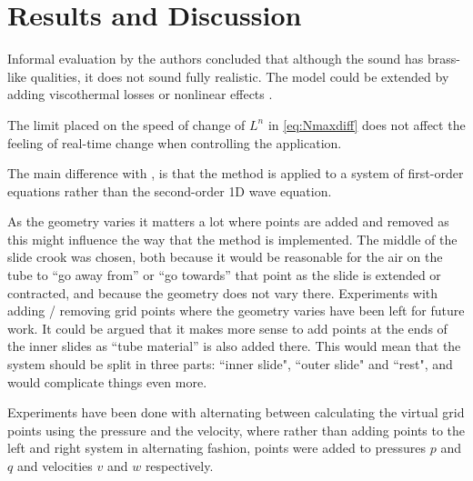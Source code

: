 \section{Results and Discussion}\label{sec:resDisc}
Informal evaluation by the authors concluded that although the sound has brass-like qualities, it does not sound fully realistic. The model could be extended by adding viscothermal losses \cite{Harrison2016} or nonlinear effects \cite{msallam1997physical}.

The limit placed on the speed of change of $L^n$ in \eqref{eq:Nmaxdiff} does not affect the feeling of real-time change when controlling the application.

The main difference with \cite{Willemsen2021}, is that the method is applied to a system of first-order equations rather than the second-order 1D wave equation.

As the geometry varies it matters a lot where points are added and removed as this might influence the way that the method is implemented.  The middle of the slide crook was chosen, both because it would be reasonable for the air on the tube to ``go away from'' or ``go towards'' that point as the slide is extended or contracted, and because the geometry does not vary there. Experiments with adding / removing grid points where the geometry varies have been left for future work.  It could be argued that it makes more sense to add points at the ends of the inner slides as ``tube material'' is also added there. This would mean that the system should be split in three parts: ``inner slide", ``outer slide" and ``rest", and would complicate things even more.

Experiments have been done with alternating between calculating the virtual grid points using the pressure and the velocity, where rather than adding points to the left and right system in alternating fashion, points were added to pressures $p$ and $q$ and velocities $v$ and $w$ respectively.



